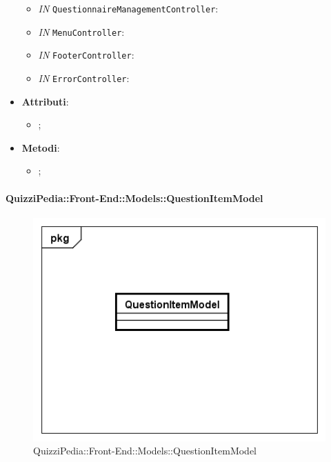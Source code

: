\begin{itemize}
\begin{itemize}
				\item \textit{IN} \texttt{QuestionnaireManagementController}: 
				\item \textit{IN} \texttt{MenuController}: 
				\item \textit{IN} \texttt{FooterController}: 
				\item \textit{IN} \texttt{ErrorController}:
			\end{itemize}
			\item \textbf{Attributi}: 
			\begin{itemize}
				\item ;
			\end{itemize}
			\item \textbf{Metodi}: 
			\begin{itemize}
				\item ;
			\end{itemize}
		\end{itemize}
		
		\paragraph{QuizziPedia::Front-End::Models::QuestionItemModel}
		
		\label{QuizziPedia::Front-End::Models::QuestionItemModel}
		
		\begin{figure}[h]
			\centering
			\includegraphics[scale=0.5,keepaspectratio]{UML/Classi/Front-End/QuizziPedia_Front-end_Models_QuestionItemModel.png}
			\caption{QuizziPedia::Front-End::Models::QuestionItemModel}
		\end{figure}
		
